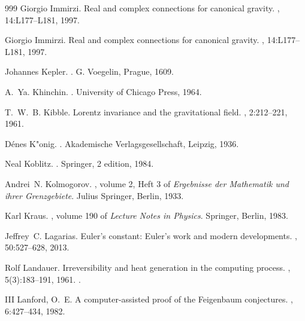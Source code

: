 \begin{thebibliography}{999}
Giorgio Immirzi.
\newblock Real and complex connections for canonical gravity.
, 14:L177--L181, 1997.

Giorgio Immirzi.
\newblock Real and complex connections for canonical gravity.
, 14:L177--L181, 1997.

Johannes Kepler.
.
\newblock G. Voegelin, Prague, 1609.

A.~Ya. Khinchin.
.
\newblock University of Chicago Press, 1964.

T.~W.~B. Kibble.
\newblock Lorentz invariance and the gravitational field.
, 2:212--221, 1961.

D{\'e}nes K{"o}nig.
.
\newblock Akademische Verlagsgesellschaft, Leipzig, 1936.

Neal Koblitz.
.
\newblock Springer, 2 edition, 1984.

Andrei~N. Kolmogorov.
, volume 2, Heft 3
  of {\em Ergebnisse der Mathematik und ihrer Grenzgebiete}.
\newblock Julius Springer, Berlin, 1933.

Karl Kraus.
, volume 190 of {\em Lecture Notes in Physics}.
\newblock Springer, Berlin, 1983.

Jeffrey~C. Lagarias.
\newblock Euler's constant: Euler's work and modern developments.
, 50:527--628,
  2013.

Rolf Landauer.
\newblock Irreversibility and heat generation in the computing process.
, 5(3):183--191, 1961.
\newblock \href {https://doi.org/10.1147/rd.53.0183}
  {}.

III Lanford, O.~E.
\newblock A computer-assisted proof of the {Feigenbaum} conjectures.
, 6:427--434,
  1982.


\end{thebibliography}
